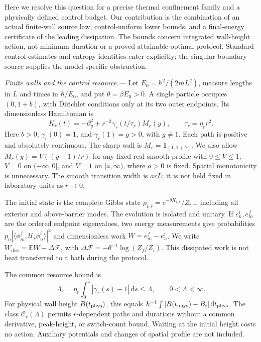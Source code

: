 \documentclass[aps,prl,reprint,superscriptaddress,longbibliography]{revtex4-2}
\newcommand{\Wd}{W_{\mathrm{diss}}}
\newcommand{\dd}{\mathrm{d}}
\begin{document}
Here we resolve this question for a precise thermal confinement family and a physically defined control budget. Our contribution is the combination of an actual finite-wall source law, control-uniform lower bounds, and a final-energy certificate of the leading dissipation. The bounds concern integrated wall-height action, not minimum duration or a proved attainable optimal protocol. Standard control estimates \cite{BoussaidCost,BoussaidWeak} and entropy identities \cite{Deffner,Francica} enter explicitly; the singular boundary source supplies the model-specific obstruction.

\emph{Finite walls and the control resource.---}
Let $E_0=\hbar^2/(2mL^2)$, measure lengths in $L$ and times in $\hbar/E_0$, and put $\theta=\beta E_0>0$. A single particle occupies $(0,1+b)$, with Dirichlet conditions only at its two outer endpoints. Its dimensionless Hamiltonian is
\begin{equation}
 K_r(t)=-\partial_y^2+r^{-2}\gamma_r(t/\tau_r)M_r(y),
 \qquad \tau_r=\eta_r r^2. \label{eq:model}
\end{equation}
Here $b>0$, $\gamma_r(0)=1$, and $\gamma_r(1)=g>0$, with $g\ne1$. Each path is positive and absolutely continuous. The sharp wall is $M_r=\mathbf1_{(1,1+b)}$. We also allow $M_r(y)=V((y-1)/r)$ for any fixed real smooth profile with $0\le V\le1$, $V=0$ on $(-\infty,0]$, and $V=1$ on $[a,\infty)$, where $a>0$ is fixed. Spatial monotonicity is unnecessary. The smooth transition width is $arL$; it is not held fixed in laboratory units as $r\to0$.

The initial state is the complete Gibbs state $\rho_{i,r}=e^{-\theta K_{i,r}}/Z_{i,r}$, including all exterior and above-barrier modes. The evolution is isolated and unitary. If $e_n^i,e_m^f$ are the ordered endpoint eigenvalues, two energy measurements give probabilities $p_n|\langle\phi_m^f,\mathcal U_r\phi_n^i\rangle|^2$ and dimensionless work $W=e_m^f-e_n^i$. We write $\Wd=\mathbb EW-\Delta\mathcal F$, with $\Delta\mathcal F=-\theta^{-1}\log(Z_f/Z_i)$. This dissipated work is not heat transferred to a bath during the protocol.

The common resource bound is
\begin{equation}
 \Lambda_r=\eta_r\int_0^1|\gamma_r(s)-1|\,\dd s\le\Lambda,\qquad0<\Lambda<\infty.
 \label{eq:action}
\end{equation}
For physical wall height $B(t_{\rm phys})$, this equals $\hbar^{-1}\int|B(t_{\rm phys})-B_i|\,\dd t_{\rm phys}$. The class $\mathcal C_r(\Lambda)$ permits $r$-dependent paths and durations without a common derivative, peak-height, or switch-count bound. Waiting at the initial height costs no action. Auxiliary potentials and changes of spatial profile are not included.
\end{document}
